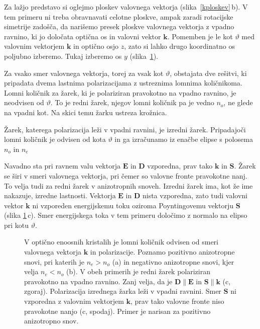 Za lažjo predstavo si oglejmo ploskev valovnega vektorja (slika~\ref{kploskev}\,b). 
V tem primeru ni treba obravnavati celotne ploskve, ampak zaradi rotacijske simetrije
zadošča, da narišemo presek ploskve valovnega vektorja z vpadno ravnino, ki jo določata 
optična os in valovni vektor $\mathbf{k}$. 
Pomemben je le kot $\vartheta$ med valovnim vektorjem $\mathbf{k}$ 
in optično osjo $z$, zato si lahko drugo koordinatno os poljubno izberemo. Tukaj izberemo
os $y$ (slika~\ref{fig:Elipsa}). 

Za vsako smer valovnega vektorja, torej za vsak kot $\vartheta$, obstajata dve rešitvi, 
ki pripadata dvema lastnima polarizacijama z ustreznima lomnima količnikoma. 
Lomni količnik za žarek, ki je polariziran pravokotno na vpadno ravnino, 
je neodvisen od $\vartheta$. To je redni žarek, njegov lomni količnik 
pa je vedno $n_o$, ne glede na vpadni kot. Na skici temu žarku ustreza krožnica.

Žarek, katerega polarizacija leži v vpadni ravnini, je izredni žarek. Pripadajoči
lomni količnik je odvisen od kota $\vartheta$ in 
ga izračunamo iz enačbe elipse s polosema $n_o$ in $n_e$ 

Navadno sta pri ravnem valu vektorja $\mathbf{E}$ in $\mathbf{D}$ vzporedna, 
prav tako $\mathbf{k}$ in $\mathbf{S}$. Žarek se širi v smeri valovnega vektorja, pri čemer
so valovne fronte pravokotne nanj. To velja tudi za redni žarek v anizotropnih
snoveh. Izredni žarek ima, kot že ime nakazuje, izredne lastnosti. Vektorja
$\mathbf{E}$ in $\mathbf{D}$ nista vzporedna, zato tudi valovni vektor $\mathbf{k}$ ni vzporeden
energijskemu toku oziroma Poyntingovemu vektorju $\mathbf{S}$ (slika \ref{fig:Elipsa}\,c). 
Smer energijskega toka v tem primeru določimo z normalo 
na elipso pri kotu $\vartheta$. 

\begin{figure}[h]
\centering
\def\svgwidth{140truemm} 

\caption{V optično enoosnih kristalih je lomni količnik odvisen
od smeri valovnega vektorja $\mathbf{k}$ in polarizacije. Poznamo pozitivno anizotropne snovi, pri katerih
je $n_e>n_o$ (a) in negativno anizotropne snovi, kjer velja $n_e< n_o$ (b). V obeh primerih je redni 
žarek polariziran pravokotno na vpadno ravnino. Zanj velja, 
da je $\mathbf{D} \parallel \mathbf{E}$ in $\mathbf{S} \parallel \mathbf{k}$ (c, zgoraj). Polarizacija 
izrednega žarka leži v vpadni ravnini. Smer $\mathbf{S}$ ni vzporedna z valovnim vektorjem
$\mathbf{k}$, prav tako valovne fronte niso pravokotne nanjo (c, spodaj). Primer je narisan za pozitivno 
anizotropno snov.}
\label{fig:Elipsa}
\end{figure}
